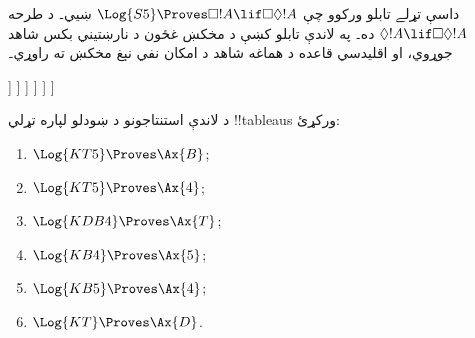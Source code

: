 \documentclass[../../../include/open-logic-section]{subfiles}
\begin{document}
\begin{ex}
  داسې تړلے تابلو ورکوو چې
  $\Log{S5} \Proves \Box!A \lif \Box\Diamond!A$ ښيي۔
  د  طرحه $\Diamond!A \lif \Box\Diamond!A$ ده۔
  په لاندې تابلو کښې د مخکښ غځون د نارښتيني بکس شاهد جوړوي،
  او اقليدسي قاعده د هماغه شاهد د امکان نفي نېغ مخکښ ته راوړي۔
  \begin{oltableau}
    [\pFmla{\False}{\Box\formula{A} \lif \Box\Diamond \formula{A}}{1},
      just = \TAss
      [\pFmla{\True}{\Box \formula{A}}{1}, just = {\TRule{\False}{\lif}[1]}
        [\pFmla{\False}{\Box\Diamond \formula{A}}{1},
          just = {\TRule{\False}{\lif}[1]}
          [\pFmla{\False}{\Diamond \formula{A}}{1.1},
            just = {\TRule{\False}{\Box}[3]}
            [\pFmla{\False}{\Diamond \formula{A}}{1},
              just = {4r$\Diamond$ 4}
              [\pFmla{\False}{\formula{A}}{1.1},
                just = {\TRule{\False}{\Diamond}[5]}
                [\pFmla{\True}{\formula{A}}{1.1},
                  just = {\TRule{\True}{\Box}[2]}, close]
              ]
            ]
          ]
        ]
      ]
    ]
  \end{oltableau}
\end{ex}

\begin{prob}
د لاندې استنتاجونو د ښودلو لپاره تړلي !!{tableau}s ورکړئ:
  \begin{enumerate}
  \item $\Log{KT5} \Proves \Ax{B}$;
  \item $\Log{KT5} \Proves \Ax{4}$;
  \item $\Log{KDB4} \Proves \Ax{T}$;
  \item $\Log{KB4} \Proves \Ax{5}$;
  \item $\Log{KB5} \Proves \Ax{4}$;
  \item $\Log{KT} \Proves \Ax{D}$.
  \end{enumerate}
\end{prob}
\end{document}
